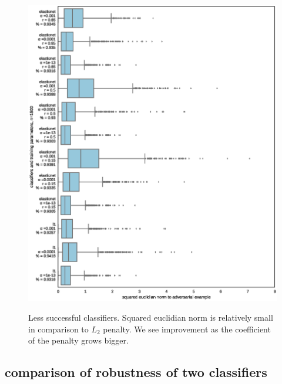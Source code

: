 \documentclass{article} %
\begin{document}
\begin{figure}[h!]

\begin{center}
\includegraphics[scale=0.5]{figs/sup_1}
\label{exp:sup_2}
\end{center}
\caption{\small Less successful classifiers. Squared euclidian norm is relatively small in comparison to $L_2$ penalty. We see improvement as the coefficient of the penalty grows bigger.}
\end{figure}


\null
\vfill
\newpage


\subsection{comparison of robustness of two classifiers}
\end{document}

